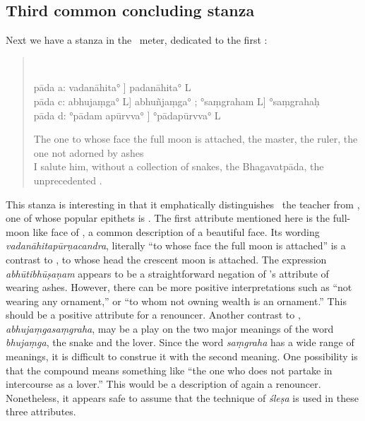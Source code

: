 \subsection{Third common concluding stanza}
\label{THETHIRDST}
Next we have a stanza in the \viyogini\ meter, dedicated to the first \Sankara:


\begin{verse}\label{SANKARASIVASTANZA}
\\
{\footnotesize 
pāda a: vadanāhita° \Tm] padanāhita° L\\
pāda c: abhujaṃga° L] abhuñjaṃga° \Tm; °saṃgraham L\Tmac] °saṃgrahaḥ \Tmpc \\
pāda d: °pādam apūrvva° \Tm] °pādapūrvva° L

}
The one to whose face the full moon is attached, the master, the ruler, the one not adorned by ashes\\
I salute him, without a collection of snakes, the Bhagavatpāda, the unprecedented \Sankara.
\end{verse}
This stanza is interesting in that it emphatically distinguishes \Sankara\ the teacher from \Siva, one of whose popular epithets is \Sankara. The first attribute mentioned here is the full-moon like face of \Sankara, a common description of a beautiful face. Its wording \emph{vadanāhitapūrṇacandra}, literally ``to whose face the full moon is attached'' is a contrast to \Siva, to whose head the crescent moon is attached. The expression \emph{abhūtibhūṣaṇam} appears to be a straightforward negation of \Siva's attribute of wearing ashes. However, there can be more positive interpretations such as ``not wearing any ornament,'' or ``to whom not owning wealth is an ornament.'' %
This should be a positive attribute for a renouncer. Another contrast to \Siva, \emph{abhujaṃgasaṃgraha}, may be a play on the two major meanings of the word \emph{bhujaṃga}, the snake and the lover. Since the word \emph{saṃgraha} has a wide range of meanings, it is difficult to construe it with the second meaning. One possibility is that the compound means something like ``the one who does not partake in intercourse as a lover.'' This would be a description of again a renouncer. Nonetheless, it appears safe to assume that the technique of \emph{śleṣa} is used in these three attributes.

